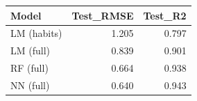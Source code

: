 
\begin{tabular}{lrr}
\toprule
Model & Test\_RMSE & Test\_R2\\
\midrule
LM (habits) & 1.205 & 0.797\\
LM (full) & 0.839 & 0.901\\
RF (full) & 0.664 & 0.938\\
NN (full) & 0.640 & 0.943\\
\bottomrule
\end{tabular}
